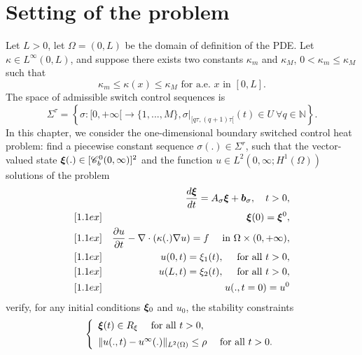 


%
%
%

%
%
\section{Setting of the problem}

Let $L>0$, let $\Omega=(0,L)$ be the domain of definition of the PDE. \medskip
Let $\kappa\in L^\infty(0,L)$, and suppose there exists two constants $\kappa_m$ and $\kappa_M$,
$0<\kappa_m\leq \kappa_M$ such that
\[
\kappa_m \leq \kappa(x) \leq \kappa_M \mbox{ for a.e. } x\mbox{ in } [0,L]. 
\]
The space of admissible switch control sequences is
%
\begin{equation}
\Sigma^\tau = \left\{ \sigma:[0,+\infty[ \rightarrow \{1,...,M\}, 
\sigma|_{[q\tau,(q+1)\tau[}(t)\in U\ \forall q\in \mathbb{N} \right\}.
\end{equation}
%
In this chapter, we consider the one-dimensional boundary switched control heat problem:
find a piecewise constant sequence $\sigma(.)\in \Sigma^r$, such that the vector-valued state
$\bm{\xi}(.)\in[\mathscr{C}^0_b(0,\infty)]^2$ and the function $u\in L^2(0,\infty; H^1(\Omega))$
solutions of the problem
%
\begin{eqnarray}
&& \frac{d\bm{\xi}}{dt} = A_\sigma \bm{\xi} + \bm{b}_\sigma, \quad t>0, \label{eq:2} \\ [1.1ex]
&& \bm{\xi}(0) = \bm{\xi}^0, \label{eq:3} \\ [1.1ex]
&& \frac{\partial u}{\partial t} - \nabla\cdot(\kappa(.)\nabla u) = f \quad 
\mbox{ in } \Omega\times (0,+\infty), \\ [1.1ex]
&& u(0,t) = \xi_1(t), \quad \mbox{ for all } t>0, \\ [1.1ex]
&& u(L,t) = \xi_2(t), \quad \mbox{ for all } t>0, \\ [1.1ex]
&& u(.,t=0) = u^0 \label{eq:7}
\end{eqnarray}
%
verify, for any initial conditions $\bm{\xi}_0$ and $u_0$, the stability constraints
%
\begin{equation}
\left\{\begin{array}{l}
\bxi(t) \in R_\xi \quad \mbox{ for all } t>0, \\ [1.1ex]
\| u(.,t)-u^{\infty}(.)\|_{L^2(\Omega)} \leq \rho \quad \mbox{ for all } t>0. 
\end{array}\right.
%
\label{eq:requirements}
%
\end{equation}
